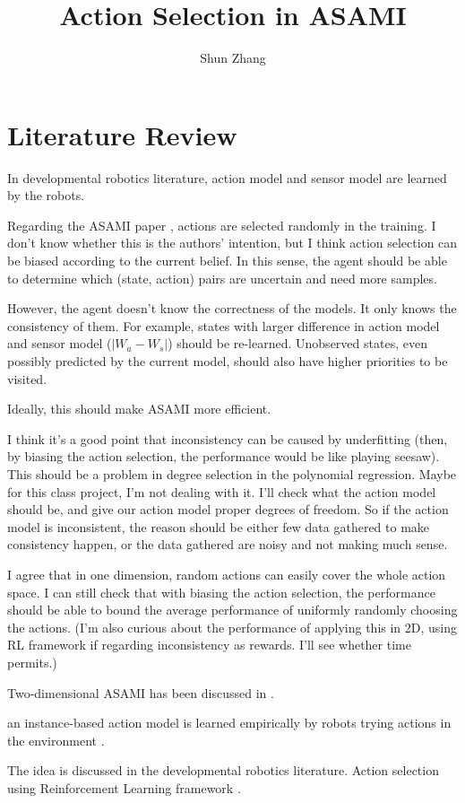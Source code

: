 \documentclass[10pt]{article}
\title{Action Selection in ASAMI}
\author{Shun Zhang}
\date{}
\begin{document}
\maketitle


\sloppy
\section{Literature Review}

In developmental robotics literature, action model and sensor model
are learned by the robots. 

Regarding the ASAMI paper \cite{CSJ06}, actions are selected randomly
in the training. I don't know whether this is the authors' intention,
but I think action selection can be biased according to the current
belief.  In this sense, the agent should be able to determine which
(state, action) pairs are uncertain and need more samples.

However, the agent doesn't know the correctness of the models. It only
knows the consistency of them. For example, states with larger
difference in action model and sensor model ($|W_a - W_s|$) should be
re-learned.  Unobserved states, even possibly predicted by the current
model, should also have higher priorities to be visited.

Ideally, this should make ASAMI more efficient.

I think it's a good point that inconsistency can be caused by
underfitting (then, by biasing the action selection, the performance
would be like playing seesaw). This should be a problem in degree
selection in the polynomial regression. Maybe for this class project,
I'm not dealing with it. I'll check what the action model should be,
and give our action model proper degrees of freedom. So if the action
model is inconsistent, the reason should be either few data gathered
to make consistency happen, or the data gathered are noisy and not
making much sense.

I agree that in one dimension, random actions can easily cover the
whole action space. I can still check that with biasing the action
selection, the performance should be able to bound the average
performance of uniformly randomly choosing the actions. (I'm also
curious about the performance of applying this in 2D, using RL
framework if regarding inconsistency as rewards.  I'll see whether
time permits.)

Two-dimensional ASAMI has been discussed in \cite{ICRA08-stronger}.

an instance-based action model is learned empirically by robots trying
actions in the environment \cite{LNAI2007-ahmadi}.

The idea is discussed in the developmental robotics literature. Action
selection using Reinforcement Learning framework
\cite{oudeyer2006discovering} \cite{schmidhuber2006developmental}.




\end{document}
